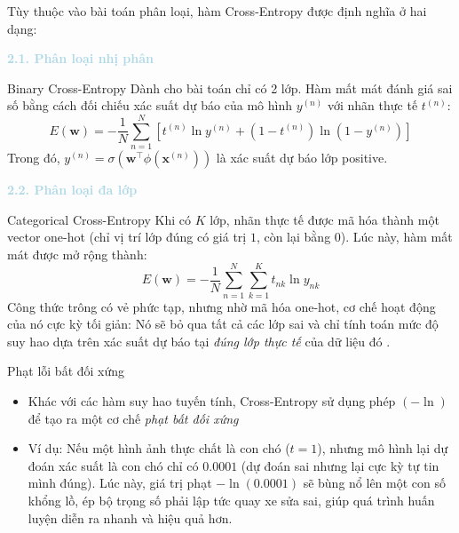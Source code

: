 Tùy thuộc vào bài toán phân loại, hàm Cross-Entropy được định nghĩa ở hai dạng:

\vspace{0.5em}
\noindent\textcolor{lightblue}{\textbf{2.1. Phân loại nhị phân}}

\begin{importantbox}{Binary Cross-Entropy}
Dành cho bài toán chỉ có 2 lớp. Hàm mất mát đánh giá sai số bằng cách đối chiếu xác suất dự báo của mô hình $y^{(n)}$ với nhãn thực tế $t^{(n)}$:
\begin{equation}
    E(\mathbf{w}) = - \frac{1}{N} \sum_{n=1}^N \left[ t^{(n)} \ln y^{(n)} + (1-t^{(n)}) \ln(1-y^{(n)}) \right]
\end{equation}
Trong đó, $y^{(n)} = \sigma(\mathbf{w}^\top \phi(\mathbf{x}^{(n)}))$ là xác suất dự báo lớp positive.
\end{importantbox}

\vspace{0.5em}
\noindent\textcolor{lightblue}{\textbf{2.2. Phân loại đa lớp}}

\begin{importantbox}{Categorical Cross-Entropy}
Khi có $K$ lớp, nhãn thực tế được mã hóa thành một vector one-hot (chỉ vị trí lớp đúng có giá trị $1$, còn lại bằng $0$). Lúc này, hàm mất mát được mở rộng thành:
\begin{equation}
    E(\mathbf{w}) = - \frac{1}{N} \sum_{n=1}^N \sum_{k=1}^K t_{nk} \ln y_{nk}
\end{equation}
Công thức trông có vẻ phức tạp, nhưng nhờ mã hóa one-hot, cơ chế hoạt động của nó cực kỳ tối giản: Nó sẽ bỏ qua tất cả các lớp sai và chỉ tính toán mức độ suy hao dựa trên xác suất dự báo tại \textit{đúng lớp thực tế} của dữ liệu đó \cite{zhang2021dive}.
\end{importantbox}

\begin{notebox}{Phạt lỗi bất đối xứng}
\begin{itemize}
    \item Khác với các hàm suy hao tuyến tính, Cross-Entropy sử dụng phép $(-\ln)$ để tạo ra một cơ chế \textit{phạt bất đối xứng}
    \item Ví dụ: Nếu một hình ảnh thực chất là con chó ($t=1$), nhưng mô hình lại dự đoán xác suất là con chó chỉ có $0.0001$ (dự đoán sai nhưng lại cực kỳ tự tin mình đúng). Lúc này, giá trị phạt $-\ln(0.0001)$ sẽ bùng nổ lên một con số khổng lồ, ép bộ trọng số phải lập tức quay xe sửa sai, giúp quá trình huấn luyện diễn ra nhanh và hiệu quả hơn.
\end{itemize}
\end{notebox}

